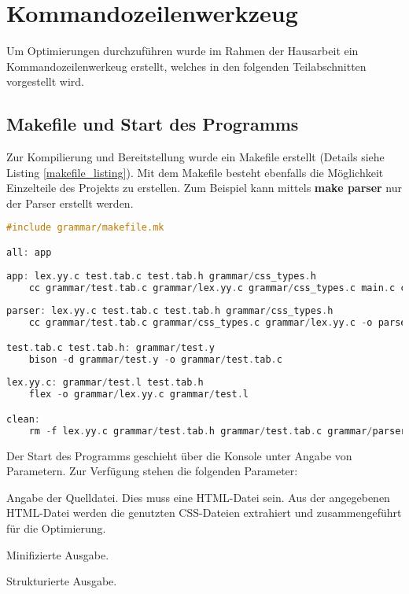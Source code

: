 \section{Kommandozeilenwerkzeug}
Um Optimierungen durchzuführen wurde im Rahmen der Hausarbeit ein Kommandozeilenwerkeug erstellt, welches in den folgenden Teilabschnitten vorgestellt wird.

\subsection{Makefile und Start des Programms}
Zur Kompilierung und Bereitstellung wurde ein Makefile erstellt (Details siehe Listing \ref{makefile_listing}). Mit dem Makefile besteht ebenfalls die Möglichkeit Einzelteile des Projekts zu erstellen. Zum Beispiel kann mittels \textbf{make parser} nur der Parser erstellt werden.
\begin{lstlisting}[label=makefile_listing,language=C, caption=Makefile]
#include grammar/makefile.mk

all: app
	
app: lex.yy.c test.tab.c test.tab.h grammar/css_types.h
	cc grammar/test.tab.c grammar/lex.yy.c grammar/css_types.c main.c cli_parse.c css_merge.c guiCSS.c optimizer.c output.c -lncurses -o optimCSS
	
parser: lex.yy.c test.tab.c test.tab.h grammar/css_types.h
	cc grammar/test.tab.c grammar/css_types.c grammar/lex.yy.c -o parser

test.tab.c test.tab.h: grammar/test.y
	bison -d grammar/test.y -o grammar/test.tab.c
            
lex.yy.c: grammar/test.l test.tab.h
	flex -o grammar/lex.yy.c grammar/test.l

clean: 
	rm -f lex.yy.c grammar/test.tab.h grammar/test.tab.c grammar/parser optimCSS
\end{lstlisting}

Der Start des Programms geschieht über die Konsole unter Angabe von Parametern. Zur Verfügung stehen die folgenden Parameter:

\begin{description}[label=description_program_start]
   \item[-f dateiname] Angabe der Quelldatei. Dies muss eine HTML-Datei sein. Aus der angegebenen HTML-Datei werden die genutzten CSS-Dateien extrahiert und zusammengeführt für die Optimierung.
   \item[-m] Minifizierte Ausgabe.
   \item[-s] Strukturierte Ausgabe.
\end{description}

